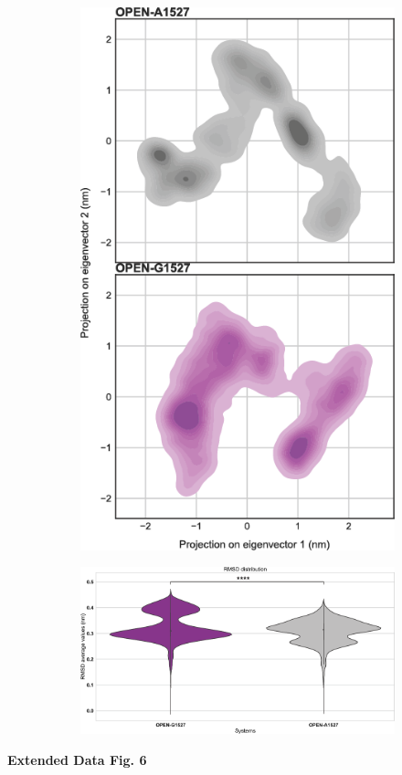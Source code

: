 \begin{figure}[H]
\begin{subfigure}[t]{.25\textwidth}
        \includegraphics[width=\textwidth]{../paper/extended_plots/rmsd_projection_open.png}        
    \end{subfigure}
    \hspace{1cm}
    \begin{subfigure}[t]{.5\textwidth}
        \caption{}
        \includegraphics[width=\textwidth]{../paper/extended_plots/rmsd_volcano.png}        
    \end{subfigure}
\end{figure}
\textbf{Extended Data Fig. 6}